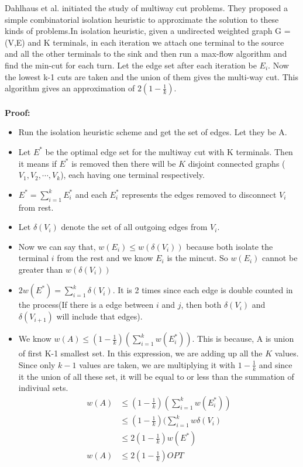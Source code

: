 \documentclass[11pt]{article}
\begin{document}
Dahlhaus et al.\cite{Dahlhaus} initiated the study of multiway cut problems. They proposed a simple combinatorial isolation heuristic to approximate the solution to these kinds of problems.In isolation heuristic, given a undirected weighted graph G = (V,E) and K terminals, in each iteration we attach one terminal to the source and all the other terminals to the sink and then run a max-flow algorithm and find the min-cut for each turn. Let the edge set after each iteration be $E_i$. Now the lowest k-1 cuts are taken and the union of them gives the multi-way cut. This algorithm gives an approximation of $2(1-\frac{1}{k})$.\\\\
\textbf{Proof:}
\begin{itemize}
    \item Run the isolation heuristic scheme and get the set of edges. Let they be A.
    \item Let $E^*$ be the optimal edge set for the multiway cut with K terminals. Then it means if $E^*$ is removed then there will be $K$ disjoint connected graphs ($V_1, V_2,\cdots,V_k$), each having one terminal respectively.
    \item $E^* = \sum_{i=1}^{k}{E_i^*}$ and each $E_i^*$ represents the edges removed to disconnect $V_i$ from rest.
    \item Let $\delta(V_i)$ denote the set of all outgoing edges from $V_i$.
    \item Now we can say that, $w(E_i) \le w(\delta(V_i))$ because both isolate the terminal $i$ from the rest and we know $E_i$ is the mincut. So $w(E_i)$ cannot be greater than $w(\delta(V_i))$
    \item $2w(E^*) = \sum_{i=1}^{k}{\delta(V_i)} $. It is 2 times since each edge is double counted in the process(If there is a edge between $i$ and $j$, then both $\delta(V_i)$ and $\delta(V_{i+1})$ will include that edges).
    \item We know $w(A) \le (1 -\frac{1}{k})(\sum_{i=1}^k w(E_i^*))$. This is because, A is union of first K-1 smallest set. In this expression, we are adding up all the $K$ values. Since only $k-1$ values are taken, we are multiplying it with $1 - \frac{1}{k}$ and since it the union of all these set, it will be equal to or less than the summation of indiviual sets.
        \begin{align*}
            w(A) &\le (1 -\frac{1}{k})(\sum_{i=1}^k w(E_i^*)) \\
            &\le (1 -\frac{1}{k})(\sum_{i=1}^k w{\delta(V_i)}\\
            &\le 2(1 -\frac{1}{k})w(E^*)\\
          w(A)  &\le 2(1 -\frac{1}{k}) OPT
        \end{align*}
\end{itemize}
\end{document}
